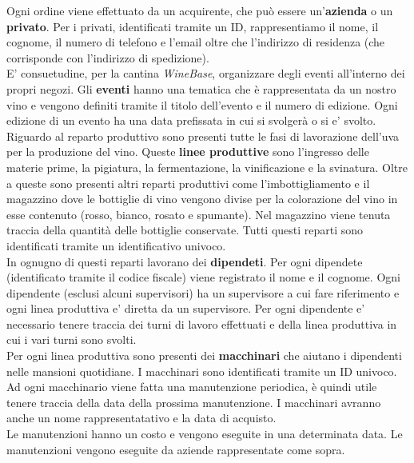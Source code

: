 Ogni ordine viene effettuato da un acquirente, che può essere un'\textbf{azienda} o un \textbf{privato}. Per i privati, identificati tramite un ID, rappresentiamo il nome, il cognome, il numero di telefono e l'email oltre che l'indirizzo di residenza (che corrisponde con l'indirizzo di spedizione).\\
E' consuetudine, per la cantina \emph{WineBase}, organizzare degli eventi all'interno dei propri negozi. Gli \textbf{eventi} hanno una tematica che è rappresentata da un nostro vino e vengono definiti tramite il titolo dell'evento e il numero di edizione. Ogni edizione di un evento ha una data prefissata in cui si svolgerà o si e' svolto.
Riguardo al reparto produttivo sono presenti tutte le fasi di lavorazione dell'uva per la produzione del vino. Queste \textbf{linee produttive} sono l'ingresso delle materie prime, la pigiatura, la fermentazione, la vinificazione e la svinatura. Oltre a queste sono presenti altri reparti produttivi come l'imbottigliamento e il magazzino dove le bottiglie di vino vengono divise per la colorazione del vino in esse contenuto (rosso, bianco, rosato e spumante). Nel magazzino viene tenuta traccia della quantità delle bottiglie conservate. Tutti questi reparti sono identificati tramite un identificativo univoco.\\
In ognugno di questi reparti lavorano dei \textbf{dipendeti}. Per ogni dipendete (identificato tramite il codice fiscale) viene registrato il nome e il cognome. Ogni dipendente (esclusi alcuni supervisori) ha un supervisore a cui fare riferimento e ogni linea produttiva e' diretta da un supervisore. Per ogni dipendente e' necessario tenere traccia dei turni di lavoro effettuati e della linea produttiva in cui i vari turni sono svolti.\\
Per ogni linea produttiva sono presenti dei \textbf{macchinari} che aiutano i dipendenti nelle mansioni quotidiane. I macchinari sono identificati tramite un ID univoco. Ad ogni macchinario viene fatta una manutenzione periodica, è quindi utile tenere traccia della data della prossima manutenzione. I macchinari avranno anche un nome rappresentatativo e la data di acquisto.\\
Le manutenzioni hanno un costo e vengono eseguite in una determinata data. Le manutenzioni vengono eseguite da aziende rappresentate come sopra.